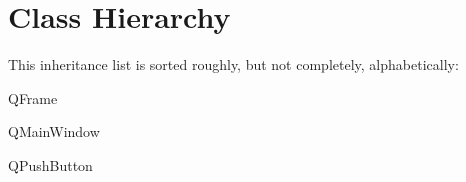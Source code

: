 \section{Class Hierarchy}
This inheritance list is sorted roughly, but not completely, alphabetically\-:\begin{DoxyCompactList}
\item {}
\item Q\-Frame\begin{DoxyCompactList}
\item {}
\end{DoxyCompactList}
\item Q\-Main\-Window\begin{DoxyCompactList}
\item {}
\end{DoxyCompactList}
\item Q\-Push\-Button\begin{DoxyCompactList}
\item {}
\end{DoxyCompactList}
\end{DoxyCompactList}
